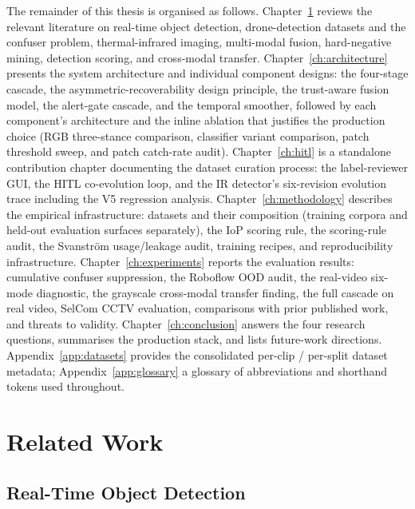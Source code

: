 \documentclass[12pt,a4paper,oneside,openright]{book}
\begin{document}
The remainder of this thesis is organised as follows. Chapter~\ref{ch:literature} reviews the relevant literature on real-time object detection, drone-detection datasets and the confuser problem, thermal-infrared imaging, multi-modal fusion, hard-negative mining, detection scoring, and cross-modal transfer. Chapter~\ref{ch:architecture} presents the system architecture and individual component designs: the four-stage cascade, the asymmetric-recoverability design principle, the trust-aware fusion model, the alert-gate cascade, and the temporal smoother, followed by each component's architecture and the inline ablation that justifies the production choice (RGB three-stance comparison, classifier variant comparison, patch threshold sweep, and patch catch-rate audit). Chapter~\ref{ch:hitl} is a standalone contribution chapter documenting the dataset curation process: the label-reviewer GUI, the HITL co-evolution loop, and the IR detector's six-revision evolution trace including the V5 regression analysis. Chapter~\ref{ch:methodology} describes the empirical infrastructure: datasets and their composition (training corpora and held-out evaluation surfaces separately), the IoP scoring rule, the scoring-rule audit, the Svanstr\"om usage/leakage audit, training recipes, and reproducibility infrastructure. Chapter~\ref{ch:experiments} reports the evaluation results: cumulative confuser suppression, the Roboflow OOD audit, the real-video six-mode diagnostic, the grayscale cross-modal transfer finding, the full cascade on real video, SelCom CCTV evaluation, comparisons with prior published work, and threats to validity. Chapter~\ref{ch:conclusion} answers the four research questions, summarises the production stack, and lists future-work directions. Appendix~\ref{app:datasets} provides the consolidated per-clip / per-split dataset metadata; Appendix~\ref{app:glossary} a glossary of abbreviations and shorthand tokens used throughout.

\chapter{Related Work}
\label{ch:literature}

\section{Real-Time Object Detection}
\label{sec:lit_objdet}
\end{document}
